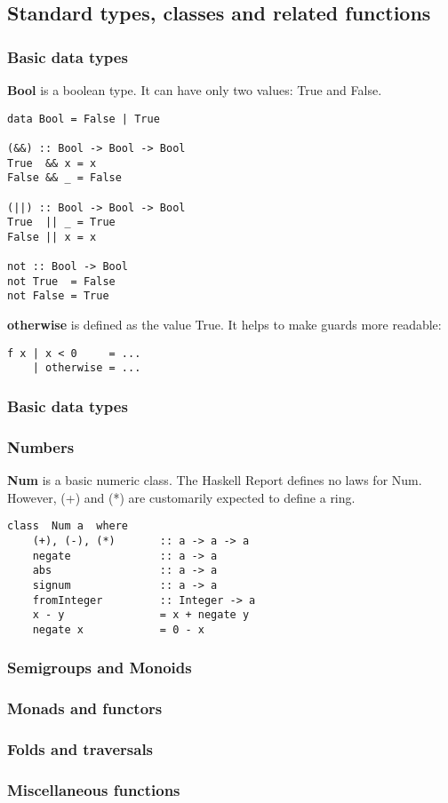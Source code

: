 %

\subsection{Standard types, classes and related functions}

\subsubsection{Basic data types}
\textbf{Bool} is a boolean type. It can have only two values: True and False.
\begin{verbatim}
data Bool = False | True

(&&) :: Bool -> Bool -> Bool
True  && x = x
False && _ = False

(||) :: Bool -> Bool -> Bool
True  || _ = True
False || x = x

not :: Bool -> Bool
not True  = False
not False = True
\end{verbatim}

\textbf{otherwise} is defined as the value True. It helps to make guards more readable:
\begin{verbatim}
f x | x < 0     = ...
    | otherwise = ...
\end{verbatim}

\subsubsection{Basic data types}

\subsubsection{Numbers}

\textbf{Num} is a basic numeric class.
The Haskell Report defines no laws for Num.
However, (+) and (*) are customarily expected to define a ring.
\begin{verbatim}
class  Num a  where
    (+), (-), (*)       :: a -> a -> a
    negate              :: a -> a
    abs                 :: a -> a
    signum              :: a -> a
    fromInteger         :: Integer -> a
    x - y               = x + negate y
    negate x            = 0 - x
\end{verbatim}


\subsubsection{Semigroups and Monoids}

\subsubsection{Monads and functors}

\subsubsection{Folds and traversals}

\subsubsection{Miscellaneous functions}

%